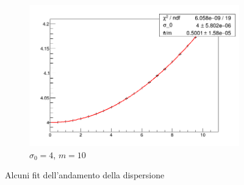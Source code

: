 \begin{figure}[h]
\begin{subfigure}[b]{0.3\textwidth}
		\includegraphics[width=\linewidth]{IMG/dispersione_m2s4}
		\caption{$\sigma_0=4$, $m=10$}
	\end{subfigure}
	\caption{Alcuni fit dell'andamento della dispersione}\label{fig:dispersioneFitSigma4}
\end{figure}

